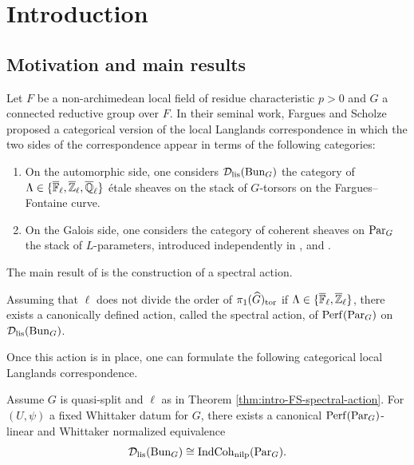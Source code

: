 \section{Introduction}\label{sec:intro}

\subsection{Motivation and main results}
Let $F$ be a non-archimedean local field of residue characteristic $p > 0$ and $G$ a connected reductive group over $F$. 
In their seminal work, Fargues and Scholze \cite{Geometrization} proposed a categorical version of the local Langlands correspondence in which the two sides of the correspondence appear in terms of the following categories:
\begin{enumerate}
    \item On the automorphic side, one considers $\mathcal{D}_{\mathrm{lis}}(\mathrm{Bun}_G)$ the category of $\Lambda \in \{\overline{\mathbb{F}}_{\ell}, \overline{\mathbb{Z}}_{\ell}, \overline{\mathbb{Q}}_{\ell}\}$ étale sheaves on the stack of $G$-torsors on the Fargues--Fontaine curve. 
    \item On the Galois side, one considers the category of coherent sheaves on $\mathrm{Par}_G$ the stack of $L$-parameters, introduced independently in \cite{Geometrization}, \cite{ZhuCoherentSheaves} and \cite{DHKM}. 
\end{enumerate}
The main result of \cite{Geometrization} is the construction of a spectral action. 
\begin{thm}\label{thm:intro-FS-spectral-action}
    Assuming that $\ell$ does not divide the order of $\pi_{1}(\widehat{G})_{\textnormal{tor}}$ if $\Lambda \in \{\overline{\mathbb{F}}_{\ell}, \overline{\mathbb{Z}}_{\ell}\}$, there exists a canonically defined action, called the spectral action, of $\mathrm{Perf}(\mathrm{Par}_G)$ on $\mathcal{D}_{\mathrm{lis}}(\mathrm{Bun}_G)$. 
\end{thm}

Once this action is in place, one can formulate the following categorical local Langlands correspondence. 
\begin{conj}\label{conj:geometrization-intro}
    Assume $G$ is quasi-split and $\ell$ as in Theorem \ref{thm:intro-FS-spectral-action}. For $(U,\psi)$ a fixed Whittaker datum for $G$, there exists a canonical $\mathrm{Perf}(\mathrm{Par}_G)$-linear and Whittaker normalized equivalence 
    \begin{equation}\label{eq:conj-geometrization-intro}
        \mathcal{D}_{\mathrm{lis}}(\mathrm{Bun}_G) \cong \mathrm{IndCoh}_{\mathrm{nilp}}(\mathrm{Par}_G).
    \end{equation}
\end{conj}


